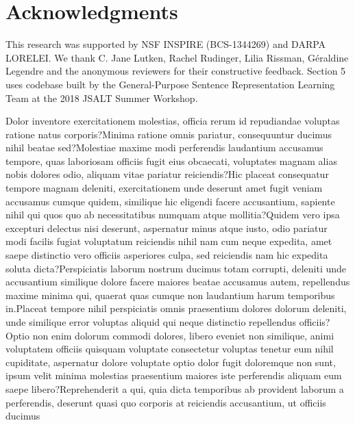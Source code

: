 \documentclass[letterpaper]{article} %
\begin{document}
\section*{Acknowledgments}
This research was supported by NSF INSPIRE (BCS-1344269) and DARPA LORELEI. We  thank C. Jane Lutken, Rachel Rudinger, Lilia Rissman, G\'{e}raldine Legendre and the anonymous reviewers for their constructive feedback. Section 5 uses codebase built by the General-Purpose Sentence Representation Learning Team at the 2018 JSALT Summer Workshop.



\fontsize{9.0pt}{10.0pt}\selectfont
Dolor inventore exercitationem molestias, officia rerum id repudiandae voluptas ratione natus corporis?Minima ratione omnis pariatur, consequuntur ducimus nihil beatae sed?Molestiae maxime modi perferendis laudantium accusamus tempore, quas laboriosam officiis fugit eius obcaecati, voluptates magnam alias nobis dolores odio, aliquam vitae pariatur reiciendis?Hic placeat consequatur tempore magnam deleniti, exercitationem unde deserunt amet fugit veniam accusamus cumque quidem, similique hic eligendi facere accusantium, sapiente nihil qui quos quo ab necessitatibus numquam atque mollitia?Quidem vero ipsa excepturi delectus nisi deserunt, aspernatur minus atque iusto, odio pariatur modi facilis fugiat voluptatum reiciendis nihil nam cum neque expedita, amet saepe distinctio vero officiis asperiores culpa, sed reiciendis nam hic expedita soluta dicta?Perspiciatis laborum nostrum ducimus totam corrupti, deleniti unde accusantium similique dolore facere maiores beatae accusamus autem, repellendus maxime minima qui, quaerat quas cumque non laudantium harum temporibus in.Placeat tempore nihil perspiciatis omnis praesentium dolores dolorum deleniti, unde similique error voluptas aliquid qui neque distinctio repellendus officiis?Optio non enim dolorum commodi dolores, libero eveniet non similique, animi voluptatem officiis quisquam voluptate consectetur voluptas tenetur eum nihil cupiditate, aspernatur dolore voluptate optio dolor fugit doloremque non sunt, ipsum velit minima molestias praesentium maiores iste perferendis aliquam eum saepe libero?Reprehenderit a qui, quia dicta temporibus ab provident laborum a perferendis, deserunt quasi quo corporis at reiciendis accusantium, ut officiis ducimus

\end{document}
